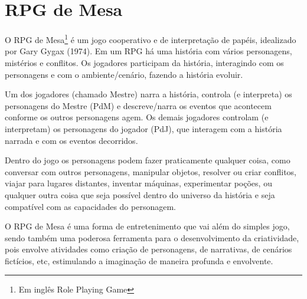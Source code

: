 \chapter{\label{ch:rpg}RPG de Mesa}

O RPG de Mesa\footnote{Em inglês Role Playing Game} é um jogo cooperativo e de interpretação de papéis, idealizado por Gary Gygax (1974). Em um RPG há uma história com vários personagens, mistérios e conflitos. Os jogadores participam da história, interagindo com os personagens e com o ambiente/cenário, fazendo a história evoluir.

Um dos jogadores (chamado Mestre) narra a história, controla (e interpreta) os personagens do Mestre (PdM) e descreve/narra os eventos que acontecem conforme os outros personagens agem. Os demais jogadores controlam (e interpretam) os personagens do jogador (PdJ), que interagem com a história narrada e com os eventos decorridos. 

Dentro do jogo os personagens podem fazer praticamente qualquer coisa, como conversar com outros personagens, manipular objetos, resolver ou criar conflitos, viajar para lugares distantes, inventar máquinas, experimentar poções, ou qualquer outra coisa que seja possível dentro do universo da história e seja compatível com as capacidades do personagem.

O RPG de Mesa é uma forma de entretenimento que vai além do simples jogo, sendo também uma poderosa ferramenta para o desenvolvimento da criatividade, pois envolve atividades como criação de personagens, de narrativas, de cenários fictícios, etc, estimulando a imaginação de maneira profunda e envolvente.

